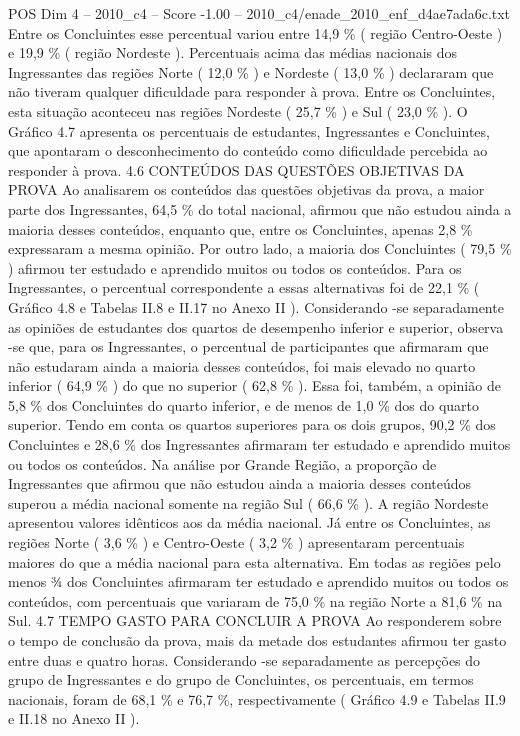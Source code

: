 \begin{textsample}{POS Dim 4 – 2010\_c4 – Score -1.00 – 2010\_c4/enade\_2010\_enf\_d4ae7ada6c.txt}
Entre os Concluintes esse percentual variou entre 14,9 \% ( região Centro-Oeste ) e 19,9 \% ( região Nordeste ).
Percentuais acima das médias nacionais dos Ingressantes das regiões Norte ( 12,0 \% ) e Nordeste ( 13,0 \% ) declararam que não tiveram qualquer dificuldade para responder à prova.
Entre os Concluintes, esta situação aconteceu nas regiões Nordeste ( 25,7 \% ) e Sul ( 23,0 \% ).
O Gráfico 4.7 apresenta os percentuais de estudantes, Ingressantes e Concluintes, que apontaram o desconhecimento do conteúdo como dificuldade percebida ao responder à prova. 4.6 CONTEÚDOS DAS QUESTÕES OBJETIVAS DA PROVA Ao analisarem os conteúdos das questões objetivas da prova, a maior parte dos Ingressantes, 64,5 \% do total nacional, afirmou que não estudou ainda a maioria desses conteúdos, enquanto que, entre os Concluintes, apenas 2,8 \% expressaram a mesma opinião.
Por outro lado, a maioria dos Concluintes ( 79,5 \% ) afirmou ter estudado e aprendido muitos ou todos os conteúdos.
Para os Ingressantes, o percentual correspondente a essas alternativas foi de 22,1 \% ( Gráfico 4.8 e Tabelas II.8 e II.17 no Anexo II ).
Considerando -se separadamente as opiniões de estudantes dos quartos de desempenho inferior e superior, observa -se que, para os Ingressantes, o percentual de participantes que afirmaram que não estudaram ainda a maioria desses conteúdos, foi mais elevado no quarto inferior ( 64,9 \% ) do que no superior ( 62,8 \% ).
Essa foi, também, a opinião de 5,8 \% dos Concluintes do quarto inferior, e de menos de 1,0 \% dos do quarto superior.
Tendo em conta os quartos superiores para os dois grupos, 90,2 \% dos Concluintes e 28,6 \% dos Ingressantes afirmaram ter estudado e aprendido muitos ou todos os conteúdos.
Na análise por Grande Região, a proporção de Ingressantes que afirmou que não estudou ainda a maioria desses conteúdos superou a média nacional somente na região Sul ( 66,6 \% ).
A região Nordeste apresentou valores idênticos aos da média nacional.
Já entre os Concluintes, as regiões Norte ( 3,6 \% ) e Centro-Oeste ( 3,2 \% ) apresentaram percentuais maiores do que a média nacional para esta alternativa.
Em todas as regiões pelo menos ¾ dos Concluintes afirmaram ter estudado e aprendido muitos ou todos os conteúdos, com percentuais que variaram de 75,0 \% na região Norte a 81,6 \% na Sul. 4.7 TEMPO GASTO PARA CONCLUIR A PROVA Ao responderem sobre o tempo de conclusão da prova, mais da metade dos estudantes afirmou ter gasto entre duas e quatro horas.
Considerando -se separadamente as percepções do grupo de Ingressantes e do grupo de Concluintes, os percentuais, em termos nacionais, foram de 68,1 \% e 76,7 \%, respectivamente ( Gráfico 4.9 e Tabelas II.9 e II.18 no Anexo II ).

\end{textsample}
